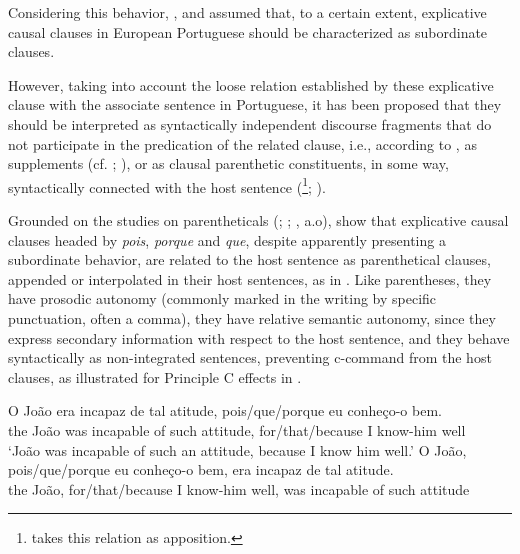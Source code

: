 \documentclass[output=paper,colorlinks,citecolor=brown,
]{langscibook}
\begin{document}
 \label{ex:matos:que-joao-comprou}
\z 

Considering this behavior, \citet{matos_coordenacao_2004}, \citet{colaco_explicative_2016} and \citet{matos_alternation_2013} assumed that, to a certain extent, explicative causal clauses in European Portuguese should be characterized as subordinate clauses. 

However, taking into account the loose relation established by these explicative clause with the associate sentence in Portuguese, it has been proposed that they should be interpreted as syntactically independent discourse fragments that do not participate in the predication of the related clause, i.e., according to \citet{huddleston_coordination_2002}, as supplements (cf. \citealt{peres_notes_2005}; \citealt{lopes_contributos_2012}), or as clausal parenthetic constituents, in some way, syntactically connected with the host sentence (\citealt{matos_coordenacao_2004}\footnote{\citet{matos_coordenacao_2004} takes this relation as apposition.}; \citealt{colaco_explicative_2016}).

Grounded on the studies on parentheticals (\citealt{dehe_parentheticals_2007}; \citealt{de_vries_unconventional_2012}; \citealt{kluck_representing_2015}, a.o), \citet{colaco_explicative_2016} show that explicative causal clauses headed by \textit{pois}, \textit{porque} and \textit{que}, despite apparently presenting a subordinate behavior, are related to the host sentence as parenthetical clauses, appended or interpolated in their host sentences, as in . Like parentheses, they have prosodic autonomy (commonly marked in the writing by specific punctuation, often a comma), they have relative semantic autonomy, since they express secondary information with respect to the host sentence, and they behave syntactically as non-integrated sentences, preventing c-command from the host clauses, as illustrated for Principle C effects in .

\ea \label{ex:matos:joao-incapaz}
 \ea \label{ex:matos:joao-incapaz-a}
 \gll O João era incapaz de tal atitude, pois/que/porque eu conheço-o bem.\\
	  the João was incapable of such attitude, for/that/because I know-him well\\
 \glt ‘João was incapable of such an attitude, because I know him well.’
 \ex \label{ex:matos:joao-incapaz-b}
 \gll O João, pois/que/porque eu conheço-o bem, era incapaz de tal atitude.\\
	 the João, for/that/because I know-him well, was incapable of such attitude\\
 \z
 \citep[49]{colaco_explicative_2016}
\z 
\end{document}
